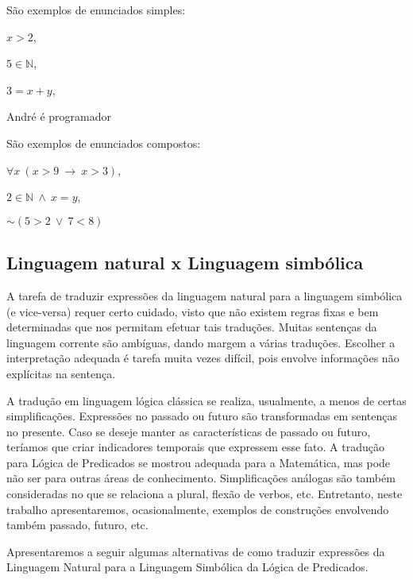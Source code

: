 \bigskip \noindent
São exemplos de enunciados simples:

\hskip 2.6cm $x > 2$,

\hskip 2.5cm $5 \in \mathbb{N}$,

\hskip 2.5cm $ 3 = x + y$,

\hskip 2.5cm André é programador

\bigskip \noindent
São exemplos de enunciados compostos:

\hskip 2.5cm $\forall x\ (x > 9\ \to\ x > 3)$,

\hskip 2.5cm $2 \in \mathbb{N}\ \land\ x = y$,

\hskip 2.5cm $\sim(5 > 2\ \lor\ 7 < 8)$

\pagebreak

    \subsection*{Linguagem natural x Linguagem simbólica}

A tarefa de traduzir expressões da linguagem natural para a linguagem simbólica (e vice-versa) requer certo cuidado, visto que não existem regras fixas e bem determinadas que nos permitam efetuar tais traduções.
Muitas sentenças da linguagem corrente são ambíguas, dando margem a várias traduções.
Escolher a interpretação adequada é tarefa muita vezes difícil, pois envolve informações não explícitas na sentença.

A tradução em linguagem lógica clássica se realiza, usualmente, a menos de certas simplificações.
Expressões no passado ou futuro são transformadas em sentenças no presente.
Caso se deseje manter as características de passado ou futuro, teríamos que criar indicadores temporais que expressem esse fato.
A tradução para Lógica de Predicados se mostrou adequada para a Matemática, mas pode não ser para outras áreas de conhecimento.
Simplificações análogas são também consideradas no que se relaciona a plural, flexão de verbos, etc.
Entretanto, neste trabalho apresentaremos, ocasionalmente, exemplos de construções envolvendo também passado, futuro, etc.

\newpage

Apresentaremos a seguir algumas alternativas de como traduzir expressões da Linguagem Natural para a Linguagem Simbólica da Lógica de Predicados.

\setcounter{exemplo}{0}

